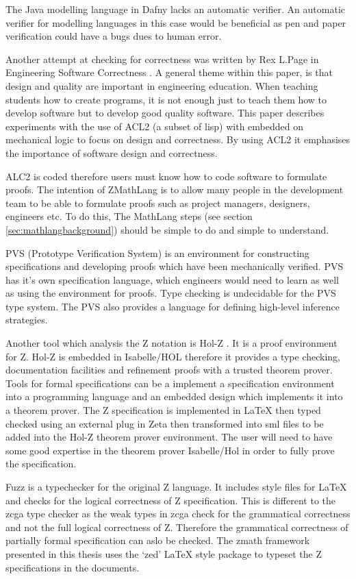 The Java modelling language in Dafny lacks an automatic verifier. An automatic verifier for modelling languages in this case would be beneficial as pen and paper verification could have a bugs dues to human error.

Another attempt at checking for correctness was written by Rex L.Page in Engineering Software Correctness \cite{engineeringsoftwarecorrectness}. A general theme within this paper, is that design and quality are important in engineering education. When teaching students how to create programs, it is not enough just to teach them how to develop software but to develop good quality software. This paper describes experiments with the use of ACL2 (a subset of lisp) with embedded on mechanical logic to focus on design and correctness. By using ACL2 it emphasises the importance of software design and correctness. 

ALC2 is coded therefore users must know how to code software to formulate proofs. The intention of ZMathLang is to allow many people in the development team to be able to formulate proofs such as project managers, designers, engineers etc. To do this, The MathLang steps (see section \ref{sec:mathlangbackground}) should be simple to do and simple to understand.

PVS (Prototype Verification System) \cite{pvs} is an environment for constructing specifications and developing proofs which have been mechanically verified. PVS has it's own specification language, which engineers would need to learn as well as using the environment for proofs. Type checking is undecidable for the PVS type system. The PVS also provides a language for defining high-level inference strategies.

Another tool which analysis the Z notation is Hol-Z \cite{hol-z}. It is a proof environment for Z. Hol-Z is embedded in Isabelle/HOL therefore it provides a type checking, documentation facilities and refinement proofs with a trusted theorem prover. Tools for formal specifications can be a implement a specification environment into a programming language and an embedded design which implements it into a theorem prover. The Z specification is implemented in \LaTeX{} then typed checked using an external plug in Zeta then transformed into sml files to be added into the Hol-Z theorem prover environment. The user will need to have some good expertise in the theorem prover Isabelle/Hol in order to fully prove the specification.

Fuzz \cite{spiveyfuzz} is a typechecker for the original Z language. It includes style files for \LaTeX{} and checks for the logical correctness of Z specification. This is different to the \gls{zcga} type checker as the weak types in \gls{zcga} check for the grammatical correctness and not the full logical correctness of Z. Therefore the grammatical correctness of partially formal specification can aslo be checked. The \gls{zmath} framework presented in this thesis uses the `zed' \LaTeX{} style package to typeset the Z specifications in the documents.


